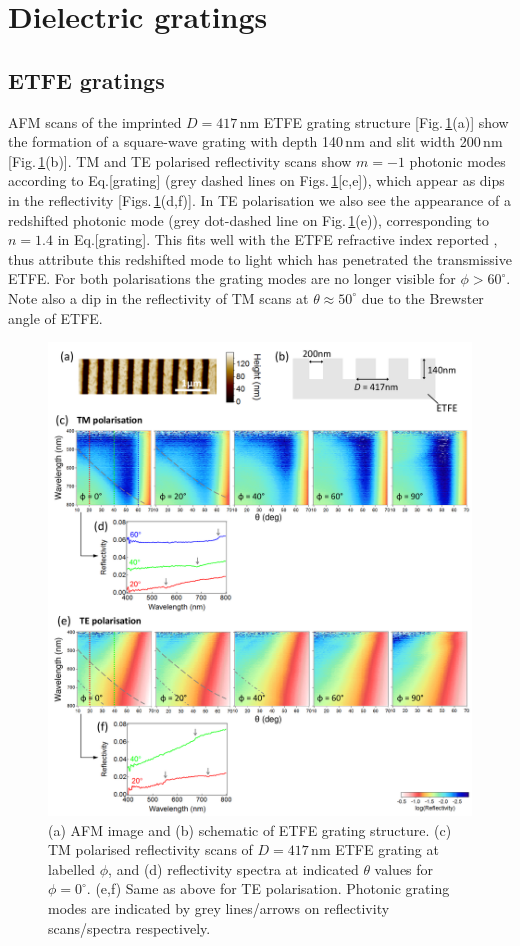 \section{Dielectric gratings}

\subsection{ETFE gratings}
AFM scans of the imprinted $D=417$\,nm ETFE grating structure [Fig.\,\ref{7Fig2}(a)] show the formation of a square-wave grating with depth 140\,nm and slit width 200\,nm [Fig.\,\ref{7Fig2}(b)]. TM and TE polarised reflectivity scans show $m=-1$ photonic modes according to Eq.[grating] (grey dashed lines on Figs.\,\ref{7Fig2}[c,e]), which appear as dips in the reflectivity [Figs.\,\ref{7Fig2}(d,f)]. In TE polarisation we also see the appearance of a redshifted photonic mode (grey dot-dashed line on Fig.\,\ref{7Fig2}(e)), corresponding to $n=1.4$ in Eq.[grating]. This fits well with the ETFE refractive index reported \cite{French2011}, thus attribute this redshifted mode to light which has penetrated the transmissive ETFE. For both polarisations the grating modes are no longer visible for $\phi>60^{\circ}$. Note also a dip in the reflectivity of TM scans at $\theta\approx50^{\circ}$ due to the Brewster angle of ETFE.
\begin{figure}[ht] 
\centering    
\includegraphics[width=\textwidth]{Fig2}
\caption{(a) AFM image and (b) schematic of ETFE grating structure. (c) TM polarised reflectivity scans of $D=417$\,nm ETFE grating at labelled $\phi$, and (d) reflectivity spectra at indicated $\theta$ values for $\phi=0^{\circ}$. (e,f) Same as above for TE polarisation. Photonic grating modes are indicated by grey lines/arrows on reflectivity scans/spectra respectively.}
\label{7Fig2}
\end{figure}


